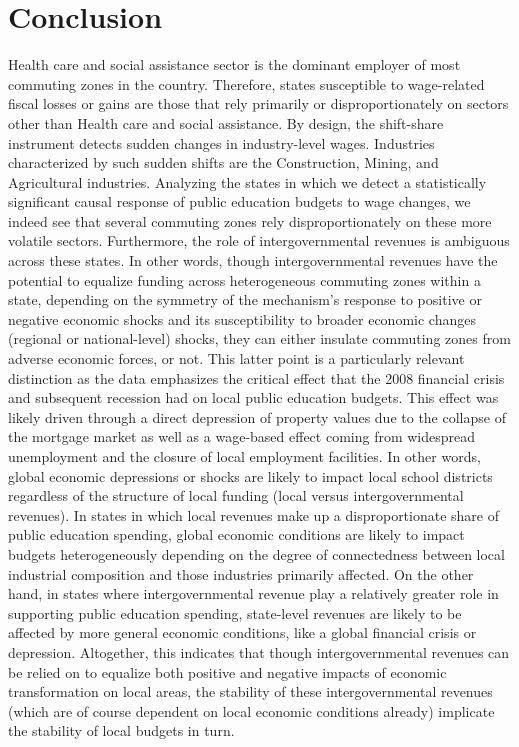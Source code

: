 \documentclass[
  10pt,
]{article}
\begin{document}
\section{Conclusion}\label{sec-conclusion}

Health care and social assistance sector is the dominant employer of
most commuting zones in the country. Therefore, states susceptible to
wage-related fiscal losses or gains are those that rely primarily or
disproportionately on sectors other than Health care and social
assistance. By design, the shift-share instrument detects sudden changes
in industry-level wages. Industries characterized by such sudden shifts
are the Construction, Mining, and Agricultural industries. Analyzing the
states in which we detect a statistically significant causal response of
public education budgets to wage changes, we indeed see that several
commuting zones rely disproportionately on these more volatile sectors.
Furthermore, the role of intergovernmental revenues is ambiguous across
these states. In other words, though intergovernmental revenues have the
potential to equalize funding across heterogeneous commuting zones
within a state, depending on the symmetry of the mechanism's response to
positive or negative economic shocks and its susceptibility to broader
economic changes (regional or national-level) shocks, they can either
insulate commuting zones from adverse economic forces, or not. This
latter point is a particularly relevant distinction as the data
emphasizes the critical effect that the 2008 financial crisis and
subsequent recession had on local public education budgets. This effect
was likely driven through a direct depression of property values due to
the collapse of the mortgage market as well as a wage-based effect
coming from widespread unemployment and the closure of local employment
facilities. In other words, global economic depressions or shocks are
likely to impact local school districts regardless of the structure of
local funding (local versus intergovernmental revenues). In states in
which local revenues make up a disproportionate share of public
education spending, global economic conditions are likely to impact
budgets heterogeneously depending on the degree of connectedness between
local industrial composition and those industries primarily affected. On
the other hand, in states where intergovernmental revenue play a
relatively greater role in supporting public education spending,
state-level revenues are likely to be affected by more general economic
conditions, like a global financial crisis or depression. Altogether,
this indicates that though intergovernmental revenues can be relied on
to equalize both positive and negative impacts of economic
transformation on local areas, the stability of these intergovernmental
revenues (which are of course dependent on local economic conditions
already) implicate the stability of local budgets in turn.
\end{document}
